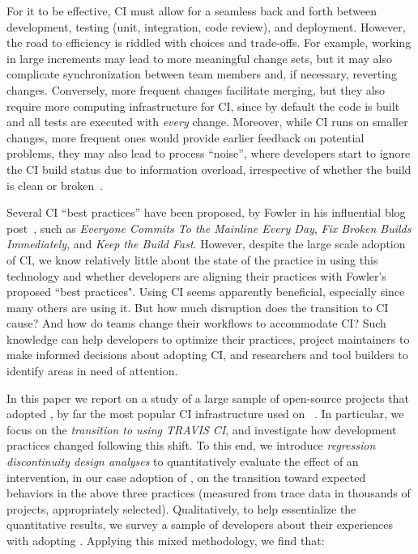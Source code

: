 For it to be effective, CI must allow for a seamless back and forth between
development, testing (\eg unit, integration, code review), and deployment. 
However, the road to efficiency is riddled with choices and trade-offs.
For example, working in large increments may lead to more meaningful
change sets, but it may also complicate synchronization between team 
members and, if necessary, reverting changes.
Conversely, more frequent changes facilitate merging, but they also require more 
computing infrastructure for CI, since by default the code is built and all 
tests are executed with \emph{every} change.
Moreover, while CI runs on smaller changes, more frequent ones would provide 
earlier feedback on potential problems, they may also lead to process 
``noise'', where developers start to ignore the CI build status due to 
information overload, irrespective of whether the build is clean or 
broken~\cite{DeadCI}.

Several CI ``best practices'' have been proposed, \eg by Fowler in his 
influential blog post~\cite{fowler2000continuous}, such as 
\emph{Everyone Commits To the Mainline Every Day}, 
\emph{Fix Broken Builds Immediately},
and \emph{Keep the Build Fast}.
However, despite the large scale adoption of CI, we know relatively little 
about the state of the practice in using this technology and whether 
developers are aligning their practices with Fowler's proposed ``best practices".
Using CI seems apparently beneficial, especially since many others are using it.
But how much disruption does the transition to CI cause?
And how do teams change their workflows to accommodate CI?
Such knowledge can help developers to optimize their practices, project 
maintainers to make informed decisions about adopting CI, and 
researchers and tool builders to identify areas in need of attention.

In this paper we report on a study of a large sample of \GH open-source 
projects that adopted \Tvis, by far the most popular 
CI infrastructure used on \GH~\cite{Hilton2016}.
In particular, we focus on the \emph{transition to using 
T{\footnotesize RAVIS} CI}, and investigate how development practices 
changed following this shift.
To this end, we introduce \emph{regression 
discontinuity design analyses} to quantitatively evaluate the effect of an intervention, in our case 
adoption of \Tvis, on the transition toward expected behaviors in the 
above three practices (measured from trace data in thousands of 
\GH projects, appropriately selected).
Qualitatively, to help essentialize the quantitative results, we survey a 
sample of \GH developers about their experiences with adopting \Tvis. 
Applying this mixed methodology, we find that:

